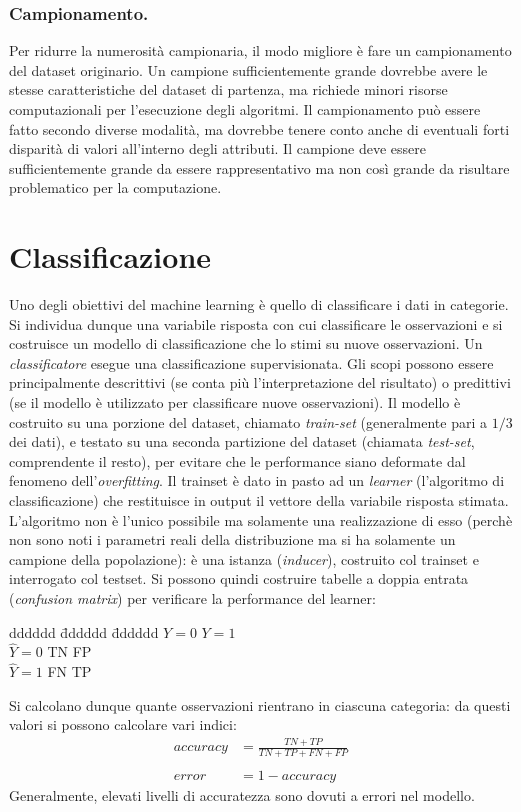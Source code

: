 \documentclass[11pt, a4page, twocolumn]{article}
\begin{document}
\section{Campionamento.}
Per ridurre la numerosità campionaria, il modo migliore è fare un campionamento del dataset originario.
Un campione sufficientemente grande dovrebbe avere le stesse caratteristiche del dataset di partenza, ma richiede minori risorse computazionali per l'esecuzione degli algoritmi.
Il campionamento può essere fatto secondo diverse modalità, ma dovrebbe tenere conto anche di eventuali forti disparità di valori all'interno degli attributi.
Il campione deve essere sufficientemente grande da essere rappresentativo ma non così grande da risultare problematico per la computazione.



\newpage
\part{Classificazione}
Uno degli obiettivi del machine learning è quello di classificare i dati in categorie.
Si individua dunque una variabile risposta con cui classificare le osservazioni e si costruisce un modello di classificazione che lo stimi su nuove osservazioni.
Un \textit{classificatore} esegue una classificazione supervisionata.
Gli scopi possono essere principalmente descrittivi (se conta più l'interpretazione del risultato) o predittivi (se il modello è utilizzato per classificare nuove osservazioni).
Il modello è costruito su una porzione del dataset, chiamato \textit{train-set} (generalmente pari a $1/3$ dei dati), e testato su una seconda partizione del dataset (chiamata \textit{test-set}, comprendente il resto), per evitare che le performance siano deformate dal fenomeno dell'\textit{overfitting}.
Il trainset è dato in pasto ad un \textit{learner} (l'algoritmo di classificazione) che restituisce in output il vettore della variabile risposta stimata.
L'algoritmo non è l'unico possibile ma solamente una realizzazione di esso (perchè non sono noti i parametri reali della distribuzione ma si ha solamente un campione della popolazione): è una istanza (\textit{inducer}), costruito col trainset e interrogato col testset.
Si possono quindi costruire tabelle a doppia entrata (\textit{confusion matrix}) per verificare la performance del learner:
\begin{tabbing}
  dddddd \= dddddd \= dddddd \kill
              \> $Y=0$ \> $Y=1$   \\
  $\hat{Y}=0$ \> TN    \> FP      \\
  $\hat{Y}=1$ \> FN    \> TP      \\
\end{tabbing}
Si calcolano dunque quante osservazioni rientrano in ciascuna categoria: da questi valori si possono calcolare vari indici:
\begin{align*}
  accuracy &= \frac{TN + TP}{TN + TP + FN + FP} \\  \\
  error &= 1 - accuracy
\end{align*}
Generalmente, elevati livelli di accuratezza sono dovuti a errori nel modello.
\end{document}
